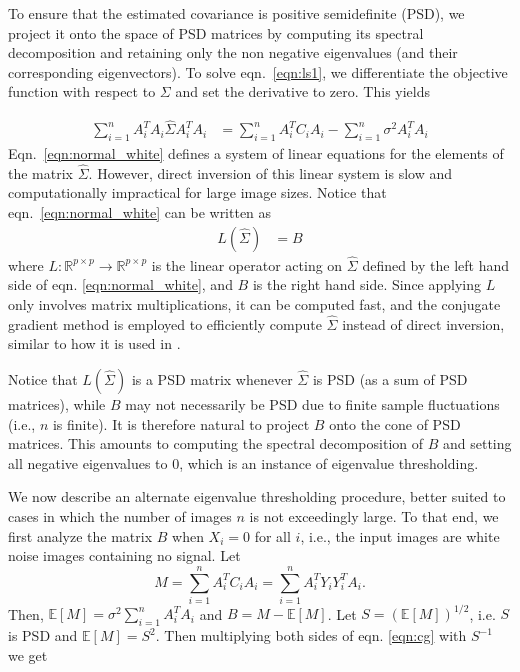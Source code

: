 \documentclass[review]{elsarticle}
\begin{document}
To ensure that the estimated
covariance is positive semidefinite (PSD), we project it onto the space of 
PSD matrices by computing
its spectral decomposition and retaining only the non negative eigenvalues (and their corresponding eigenvectors).
To solve eqn.\ \ref{eqn:ls1},
we differentiate the objective function with respect to $\Sigma$ 
and set the derivative to zero. This yields

\begin{equation}
\begin{aligned}
\sum_{i=1}^n  A_i^T  A_i \hat \Sigma A_i^T A_i
&= \sum_{i=1}^n A_i^T C_i A_i - \sum_{i=1}^n \sigma^2 A_i^T A_i 
\end{aligned}
\label{eqn:normal_white}
\end{equation}
Eqn.\ \ref{eqn:normal_white} defines a system of linear equations for the elements of the matrix $\hat \Sigma$.
However, direct inversion of this linear system is slow and computationally impractical for large image sizes.
Notice that eqn.\ \ref{eqn:normal_white} can be written as 
\begin{equation}
\begin{aligned}
L(\hat\Sigma) 
&=  B 
\label{eqn:cg}
\end{aligned}
\end{equation}
where $L:\mathbb{R}^{p\times p} \to \mathbb{R}^{p\times p}$ is the linear operator acting on $\hat{\Sigma}$ defined by the left hand side of eqn. \ref{eqn:normal_white}, and $B$ is the right hand side.
Since applying $L$ only involves matrix multiplications, it can be computed fast, and
the conjugate gradient method is employed to efficiently compute $\hat \Sigma$ instead of direct inversion,
similar to how it is used in \cite{joakim}.

Notice that $L(\hat{\Sigma})$ is a PSD matrix whenever $\hat{\Sigma}$ is PSD (as 
a sum of PSD matrices), while $B$ may not necessarily be PSD due to finite 
sample fluctuations (i.e., $n$ is finite). It is therefore natural to project 
$B$ onto the cone of PSD matrices. This amounts to computing the spectral 
decomposition of $B$ and setting all negative eigenvalues to 0, which is an 
instance of eigenvalue thresholding.

We now describe an alternate eigenvalue thresholding procedure, better suited to 
cases in which the number of images $n$ is not exceedingly large. To that end, 
we first analyze the matrix $B$ when $X_i=0$ for all $i$, i.e., the input images 
are white noise images containing no signal. Let 
\begin{equation}
M = \sum_{i=1}^n A_i^T C_i A_i = \sum_{i=1}^n A_i^T Y_i Y_i^T A_i.
\end{equation}
Then, $\mathbb{E}[M] = \sigma^2 \sum_{i=1}^n A_i^T A_i$
and $B = M - \mathbb{E}[M]$. Let $S = (\mathbb{E}[M])^{1/2}$, i.e. 
$S$ is PSD and $\mathbb{E}[M]=S^2$.
Then multiplying both sides of eqn. \ref{eqn:cg} with $S^{-1}$ we get
\end{document}
